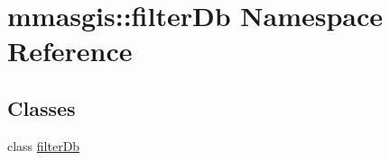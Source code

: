\hypertarget{namespacemmasgis_1_1filterDb}{
\section{mmasgis::filterDb Namespace Reference}
\label{namespacemmasgis_1_1filterDb}
}
\subsection*{Classes}
\begin{DoxyCompactItemize}
\item 
class \hyperlink{classmmasgis_1_1filterDb_1_1filterDb}{filterDb}
\end{DoxyCompactItemize}
